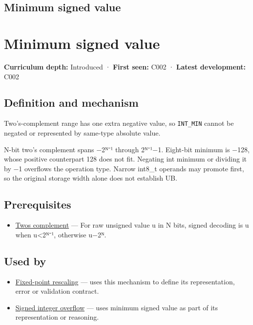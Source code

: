 \hypertarget{appendix-05f39b10364d}{}
\section*{Minimum signed value}
\chapter{Minimum signed value}\label{appendix-05f39b10364d-minimum-signed-value}

\textbf{Curriculum depth:} Introduced · \textbf{First seen:} C002 · \textbf{Latest development:} C002

\section{Definition and mechanism}\label{appendix-05f39b10364d-definition-and-mechanism}

Two's-complement range has one extra negative value, so \texttt{INT\_MIN} cannot be negated or represented by same-type absolute value.

N-bit two's complement spans −2ᴺ⁻¹ through 2ᴺ⁻¹−1. Eight-bit minimum is −128, whose positive counterpart 128 does not fit. Negating int minimum or dividing it by −1 overflows the operation type. Narrow int8\_t operands may promote first, so the original storage width alone does not establish UB.

\section{Prerequisites}\label{appendix-05f39b10364d-prerequisites}

\begin{itemize}
\tightlist
\item
  \hyperref[appendix-4fbc03d20829]{Two\textquotesingle s complement} --- For raw unsigned value u in N bits, signed decoding is u when u\textless2ᴺ⁻¹, otherwise u−2ᴺ.
\end{itemize}

\section{Used by}\label{appendix-05f39b10364d-used-by}

\begin{itemize}
\item
  \hyperref[appendix-3333db47830f]{Fixed-point rescaling} --- uses this mechanism to define its representation, error or validation contract.
\item
  \hyperref[appendix-1a599c924a4e]{Signed integer overflow} --- uses minimum signed value as part of its representation or reasoning.
\end{itemize}

